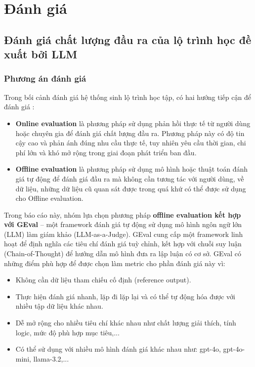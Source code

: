 \chapter{Đánh giá}

\section{Đánh giá chất lượng đầu ra của lộ trình học đề xuất bởi LLM}

\subsection{Phương án đánh giá}
Trong bối cảnh đánh giá hệ thống sinh lộ trình học tập, có hai hướng tiếp cận để đánh giá \cite{zhang2020new}:
\begin{itemize}
    \item \textbf{Online evaluation} là phương pháp sử dụng phản hồi thực tế từ người dùng hoặc chuyên gia để đánh giá chất lượng đầu ra. Phương pháp này có độ tin cậy cao và phản ánh đúng nhu cầu thực tế, tuy nhiên yêu cầu thời gian, chi phí lớn và khó mở rộng trong giai đoạn phát triển ban đầu.
    \item \textbf{Offline evaluation} là phương pháp sử dụng mô hình hoặc thuật toán đánh giá tự động để đánh giá đầu ra mà không cần tương tác với người dùng, về dữ liệu, những dữ liệu cũ quan sát được trong quá khứ có thể được sử dụng cho Offline evaluation.
\end{itemize}
Trong báo cáo này, nhóm lựa chọn phương pháp \textbf{offline evaluation kết hợp với GEval} – một framework đánh giá tự động sử dụng mô hình ngôn ngữ lớn (LLM) làm giám khảo (LLM-as-a-Judge)\cite{liu2023gevalnlgevaluationusing}. GEval cung cấp một framework linh hoạt để định nghĩa các tiêu chí đánh giá tuỳ chỉnh, kết hợp với chuỗi suy luận (Chain-of-Thought) để hướng dẫn mô hình đưa ra lập luận có cơ sở. GEval có những điểm phù hợp để được chọn làm metric cho  phần đánh giá này vì:
\begin{itemize}
    \item Không cần dữ liệu tham chiếu cố định (reference output).
    \item Thực hiện đánh giá nhanh, lặp đi lặp lại và có thể tự động hóa được với nhiều tập dữ liệu khác nhau.
    \item Dễ mở rộng cho nhiều tiêu chí khác nhau như chất lượng giải thích, tính logic, mức độ phù hợp mục tiêu,...
    \item Có thể sử dụng với nhiều mô hình đánh giá khác nhau như: gpt-4o, gpt-4o-mini, llama-3.2,...
\end{itemize}

